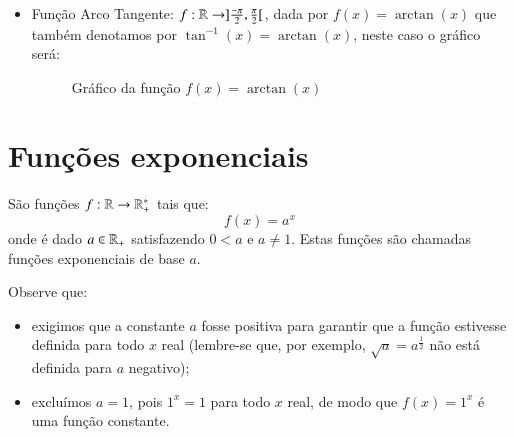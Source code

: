 \begin{itemize}
  \item Função Arco Tangente: $f: \mathbb{R} \rightarrow ]\frac{-\pi}{2}, \frac{\pi}{2}[$, dada por $f(x)= \arctan(x)$ que também denotamos por $\tan^{-1}(x)= \arctan (x)$, neste caso o gráfico será:

  \begin{figure}[H]
  \centering
    \caption{Gráfico da função $f(x)= \arctan(x)$}
  \end{figure}


  \end{itemize}


  \newpage
 \section{Funções exponenciais}

  \colorbox{azul}{
 \begin{minipage}{0.9\linewidth}
 \begin{center}
 São funções $f: \mathbb{R} \rightarrow \mathbb{R}_{+}^{*} $ tais que:
 \[f(x) = a^x\]
 onde é dado $a \in \mathbb{R}_{+}$ satisfazendo $0 < a$ e $a \neq 1$. Estas funções são chamadas funções exponenciais de base $a$.
 \end{center}
 \end{minipage}}
 \vskip0.3cm

 Observe que:
 \begin{itemize}
  \item exigimos que a constante $a$ fosse positiva para garantir que a função estivesse definida para todo $x$ real (lembre-se que, por exemplo, $\sqrt{a}= a^{\frac{1}{2}}$ não está definida para $a$ negativo);
  \item excluímos $a=1$, pois $1^x=1$ para todo $x$ real, de modo que $f(x)= 1^x$ é uma função constante.
 \end{itemize}

